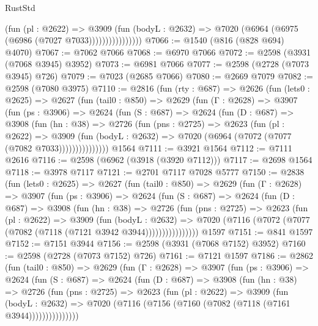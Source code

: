 \begin{lexlean}{RustStd}
\begin{coremodule}
                        (fun (pl : @2622) =>
                        @3909
                          (fun (bodyL : @2632) =>
                          @7020 (@6964 (@6975 (@6986 (@7027 @7033))))))))))))))))
@7066 := @1540 (@816 (@828 @694) @4070)
@7067 := @7062 @7066
@7068 := @6970 @7066
@7072 := @2598 (@3931 (@7068 @3945) @3952)
@7073 := @6981 @7066
@7077 := @2598 (@2728 (@7073 @3945) @726)
@7079 := @7023 (@2685 @7066)
@7080 := @2669 @7079
@7082 := @2598 (@7080 @3975)
@7110 := @2816
    (fun (rty : @687) =>
    @2626
      (fun (lets0 : @2625) =>
      @2627
        (fun (tail0 : @850) =>
        @2629
          (fun (Γ : @2628) =>
          @3907
            (fun (ps : @3906) =>
            @2624
              (fun (S : @687) =>
              @2624
                (fun (D : @687) =>
                @3908
                  (fun (hn : @38) =>
                  @2726
                    (fun (pns : @2725) =>
                    @2623
                      (fun (pl : @2622) =>
                      @3909
                        (fun (bodyL : @2632) =>
                        @7020 (@6964 (@7072 (@7077 (@7082 @7033)))))))))))))))
    @1564
@7111 := @3921 @1564
@7112 := @7111 @2616
@7116 := @2598 (@6962 (@3918 (@3920 @7112)))
@7117 := @2698 @1564
@7118 := @3978 @7117
@7121 := @2701 @7117 @7028 @5777
@7150 := @2838
    (fun (lets0 : @2625) =>
    @2627
      (fun (tail0 : @850) =>
      @2629
        (fun (Γ : @2628) =>
        @3907
          (fun (ps : @3906) =>
          @2624
            (fun (S : @687) =>
            @2624
              (fun (D : @687) =>
              @3908
                (fun (hn : @38) =>
                @2726
                  (fun (pns : @2725) =>
                  @2623
                    (fun (pl : @2622) =>
                    @3909
                      (fun (bodyL : @2632) =>
                      @7020 (@7116 (@7072 (@7077 (@7082 (@7118 (@7121 @3942 @3944))))))))))))))))
    @1597
@7151 := @841 @1597
@7152 := @7151 @3944
@7156 := @2598 (@3931 (@7068 @7152) @3952)
@7160 := @2598 (@2728 (@7073 @7152) @726)
@7161 := @7121 @1597
@7186 := @2862
    (fun (tail0 : @850) =>
    @2629
      (fun (Γ : @2628) =>
      @3907
        (fun (ps : @3906) =>
        @2624
          (fun (S : @687) =>
          @2624
            (fun (D : @687) =>
            @3908
              (fun (hn : @38) =>
              @2726
                (fun (pns : @2725) =>
                @2623
                  (fun (pl : @2622) =>
                  @3909
                    (fun (bodyL : @2632) =>
                    @7020 (@7116 (@7156 (@7160 (@7082 (@7118 (@7161 @3944)))))))))))))))

\end{coremodule}
\end{lexlean}

